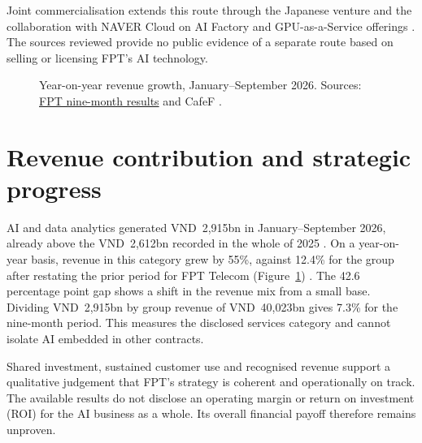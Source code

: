 \documentclass[a4paper,12pt]{report}
\begin{document}
Joint commercialisation extends this route through the Japanese venture and the collaboration with NAVER Cloud on AI Factory and GPU-as-a-Service offerings \cite{A5,A7}. The sources reviewed provide no public evidence of a separate route based on selling or licensing FPT's AI technology.

\begin{figure}[H]
\centering
{}
\caption[Revenue growth in the first nine months of 2026]{Year-on-year revenue growth, January--September 2026. Sources: \href{https://fpt.com/en/news/fpt-s-9-months-2026-revenue-and-pbt-increase-12-4-and-17-0}{FPT nine-month results} and CafeF \cite{S2}.}
\label{fig:ai-growth}
\end{figure}



\section{Revenue contribution and strategic progress}

AI and data analytics generated VND~2,915bn in January--September 2026, already above the VND~2,612bn recorded in the whole of 2025 \cite{M1,S2}. On a year-on-year basis, revenue in this category grew by 55\%, against 12.4\% for the group after restating the prior period for FPT Telecom (Figure~\ref{fig:ai-growth}) . The 42.6 percentage point gap shows a shift in the revenue mix from a small base. Dividing VND~2,915bn by group revenue of VND~40,023bn gives 7.3\% for the nine-month period. This measures the disclosed services category and cannot isolate AI embedded in other contracts.

Shared investment, sustained customer use and recognised revenue support a qualitative judgement that FPT's strategy is coherent and operationally on track. The available results do not disclose an operating margin or return on investment (ROI) for the AI business as a whole. Its overall financial payoff therefore remains unproven.


\end{document}
